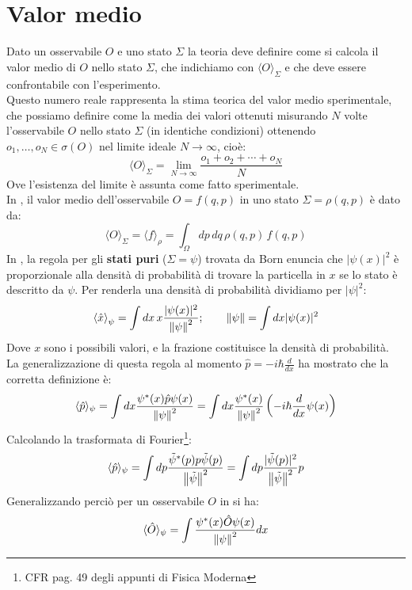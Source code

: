 \documentclass[FisicaTeorica.tex]{subfiles}
\begin{document}
\section{Valor medio}
Dato un osservabile $O$ e uno stato $\Sigma$ la teoria deve definire come si calcola il valor medio di $O$ nello stato $\Sigma$, che indichiamo con $\langle O \rangle_\Sigma$ e che deve essere confrontabile con l'esperimento.\\
Questo numero reale rappresenta la stima teorica del valor medio sperimentale, che possiamo definire come la media dei valori ottenuti misurando $N$ volte l'osservabile $O$ nello stato $\Sigma$ (in identiche condizioni) ottenendo $o_1,\dots, o_N\in\sigma(O)$ nel limite ideale $N\to\infty$, cioè:
\begin{equation}
\langle O \rangle_\Sigma =
\lim_{N\to\infty} \frac{o_1+o_2+\cdots +o_N}{N}
\label{eqn:valormediodef}
\end{equation}
Ove l'esistenza del limite è assunta come fatto sperimentale.\\
In \textbf{\MC}, il valor medio dell'osservabile $O = f(q,p)$ in uno stato $\Sigma = \rho(q,p)$ è dato da:
\begin{equation}
\langle O \rangle_\Sigma = \langle f\rangle_\rho = \int_\Omega dp\,dq\, \rho(q,p)\,f(q,p)
\label{eqn:valor-medio-classico}
\end{equation}
In \textbf{\MQ}, la regola per gli \textbf{stati puri} ($\Sigma = \psi$) trovata da Born enuncia che $|\psi(x)|^2$ è proporzionale alla densità di probabilità di trovare la particella in $x$ se lo stato è descritto da $\psi$. Per renderla una densità di probabilità dividiamo per $|\psi|^2$: %
\[
\left\langle{\hat{x}}\right\rangle_\psi = \int dx \,x \frac{|\psi(x)|^2}{\left\lVert\psi\right\rVert^2}; \quad \quad \left\lVert\psi\right\rVert = \int dx |\psi(x)|^2 
\]
Dove $x$ sono i possibili valori, e la frazione costituisce la densità di probabilità.\\
La generalizzazione di questa regola al momento $\hat{p}=-i\hbar \frac{d}{dx}$ ha mostrato che la corretta definizione è:
\[
\langle \hat{p} \rangle_\psi = \int dx \frac{\psi^*(x) \hat{p}\psi(x)}{\left\lVert\psi\right\rVert^2} = \int dx \frac{\psi^*(x)}{\left\lVert\psi\right\rVert^2} \left ( -i\hbar \frac{d}{dx}\psi(x) \right )
\]
Calcolando la trasformata di Fourier\footnote{CFR pag. 49 degli appunti di Fisica Moderna}: %
\[
\langle \hat{p} \rangle_\psi = \int dp \frac{\tilde{\psi}^*(p)p\tilde{\psi}(p)}{\left\lVert\tilde{\psi}\right\rVert^2} = \int dp\frac{|\tilde{\psi}(p)|^2}{\left\lVert\tilde{\psi}\right\rVert^2}p
\]
Generalizzando perciò per un osservabile $O$ in \textbf{\MQ} si ha:
\begin{equation}
\langle \hat{O}\rangle_\psi = \int \frac{\psi^*(x) \hat{O} \psi(x)}{\left\lVert\psi\right\rVert^2} dx
\label{eqn:valor-medio-MQ}
\end{equation}
\end{document}
